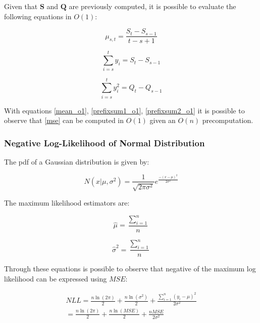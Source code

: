 Given that $\mathbf{S}$ and $\mathbf{Q}$ are previously computed, it is possible to evaluate the following equations in $O(1)$: 

\begin{equation}
    \label{mean_o1}
    \mu_{s, t} = \frac{S_{t} - S_{s - 1}}{t - s + 1}
\end{equation}

\begin{equation}
    \label{prefixsum1_o1}
    \sum \limits_{i = s}^{t} y_{i} = S_{t} - S_{s - 1}
\end{equation}

\begin{equation}
    \label{prefixsum2_o1}
    \sum \limits_{i = s}^{t} y_{i}^{2} = Q_{t} - Q_{s - 1}
\end{equation}

With equations \ref{mean_o1}, \ref{prefixsum1_o1}, \ref{prefixsum2_o1} it is possible to observe that \ref{mse} can be computed in $O(1)$ given an $O(n)$ precomputation.  

\subsubsection{Negative Log-Likelihood of Normal Distribution}

The pdf of a Gaussian distribution is given by:

\begin{equation}
    N(x | \mu, \sigma^{2}) = \frac{1}{\sqrt{2 \pi \sigma^{2}}} e^{\frac{-(x - \mu)^{2}}{2 \sigma^{2}}}
\end{equation}

The maximum likelihood estimators are:

\begin{equation}
    \widehat{\mu} = \frac{\sum \limits_{i = 1}^{n}}{n} 
\end{equation}

\begin{equation}
    \widehat{\sigma}^{2} = \frac{\sum \limits_{i = 1}^{n}}{n} 
\end{equation}

Through these equations is possible to observe that negative of the maximum log likelihood can be expressed using $MSE$:

\begin{equation}
    \begin{aligned}
        NLL = \frac{n \ln(2 \pi)}{2} + \frac{n \ln(\sigma^{2})}{2} + \frac{\sum \limits_{i = 1}^{n} (y_{i} - \mu)^{2}}{2 \sigma^{2}} \\
        = \frac{n \ln(2 \pi)}{2} + \frac{n \ln(MSE)}{2} + \frac{n MSE}{2 \sigma^{2}} \\
    \end{aligned}
\end{equation}

